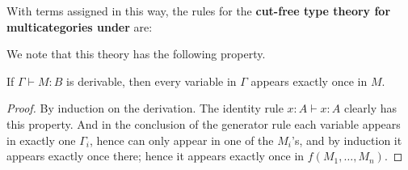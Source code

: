 \documentclass{book}
\let\types\vdash
\begin{document}
With terms assigned in this way, the rules for the \textbf{cut-free type theory for multicategories under \cG} are:
We note that this theory has the following property.

\begin{lem}\label{thm:multicat-linear}
  If $\Gamma\types M:B$ is derivable, then every variable in $\Gamma$ appears exactly once in $M$.
\end{lem}
\begin{proof}
  By induction on the derivation.
  The identity rule $x:A\types x:A$ clearly has this property.
  And in the conclusion of the generator rule each variable appears in exactly one $\Gamma_i$, hence can only appear in one of the $M_i$'s, and by induction it appears exactly once there; hence it appears exactly once in $f(M_1,\dots,M_n)$.
\end{proof}
\end{document}
